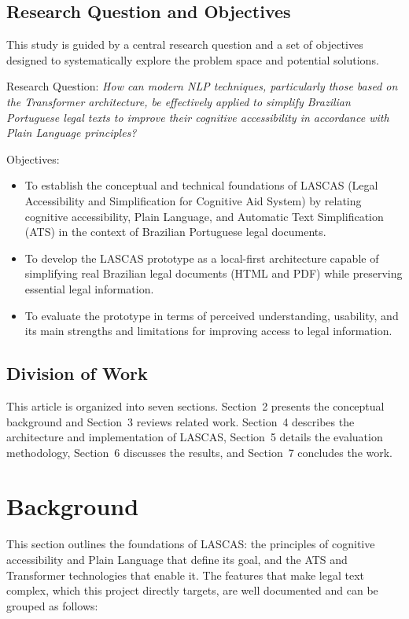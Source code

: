 \documentclass[english]{UNISINOSartigo} %
\begin{document}
\subsection{Research Question and Objectives}

This study is guided by a central research question and a set of objectives designed to systematically explore the problem space and potential solutions.

Research Question:
\textit{How can modern NLP techniques, particularly those based on the Transformer architecture, be effectively applied to simplify Brazilian Portuguese legal texts to improve their cognitive accessibility in accordance with Plain Language principles?}

Objectives:
\begin{itemize}
    \item To establish the conceptual and technical foundations of LASCAS (Legal Accessibility and Simplification for Cognitive Aid System) by relating cognitive accessibility, Plain Language, and Automatic Text Simplification (ATS) in the context of Brazilian Portuguese legal documents.
    \item To develop the LASCAS prototype as a local-first architecture capable of simplifying real Brazilian legal documents (HTML and PDF) while preserving essential legal information.
    \item To evaluate the prototype in terms of perceived understanding, usability, and its main strengths and limitations for improving access to legal information.
\end{itemize}

\subsection{Division of Work}

This article is organized into seven sections. Section~2 presents the conceptual background and Section~3 reviews related work. Section~4 describes the architecture and implementation of LASCAS, Section~5 details the evaluation methodology, Section~6 discusses the results, and Section~7 concludes the work.

\section{Background}

This section outlines the foundations of LASCAS: the principles of cognitive accessibility and Plain Language that define its goal, and the ATS and Transformer technologies that enable it. The features that make legal text complex, which this project directly targets, are well documented \cite{garimella2022insights} and can be grouped as follows:
\end{document}
